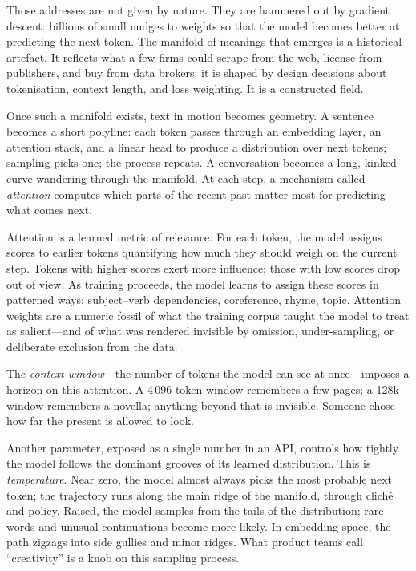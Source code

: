 \documentclass[12pt,a4paper]{article}
\begin{document}
Those addresses are not given by nature. They are hammered out by gradient descent: billions of small nudges to weights so that the model becomes better at predicting the next token. The manifold of meanings that emerges is a historical artefact. It reflects what a few firms could scrape from the web, license from publishers, and buy from data brokers; it is shaped by design decisions about tokenisation, context length, and loss weighting. It is a constructed field.

Once such a manifold exists, text in motion becomes geometry. A sentence becomes a short polyline: each token passes through an embedding layer, an attention stack, and a linear head to produce a distribution over next tokens; sampling picks one; the process repeats. A conversation becomes a long, kinked curve wandering through the manifold. At each step, a mechanism called \emph{attention} computes which parts of the recent past matter most for predicting what comes next.

Attention is a learned metric of relevance. For each token, the model assigns scores to earlier tokens quantifying how much they should weigh on the current step. Tokens with higher scores exert more influence; those with low scores drop out of view. As training proceeds, the model learns to assign these scores in patterned ways: subject--verb dependencies, coreference, rhyme, topic. Attention weights are a numeric fossil of what the training corpus taught the model to treat as salient---and of what was rendered invisible by omission, under-sampling, or deliberate exclusion from the data.

The \emph{context window}---the number of tokens the model can see at once---imposes a horizon on this attention. A 4\,096-token window remembers a few pages; a 128k window remembers a novella; anything beyond that is invisible. Someone chose how far the present is allowed to look.

Another parameter, exposed as a single number in an API, controls how tightly the model follows the dominant grooves of its learned distribution. This is \emph{temperature}. Near zero, the model almost always picks the most probable next token; the trajectory runs along the main ridge of the manifold, through cliché and policy. Raised, the model samples from the tails of the distribution; rare words and unusual continuations become more likely. In embedding space, the path zigzags into side gullies and minor ridges. What product teams call ``creativity'' is a knob on this sampling process.
\end{document}
